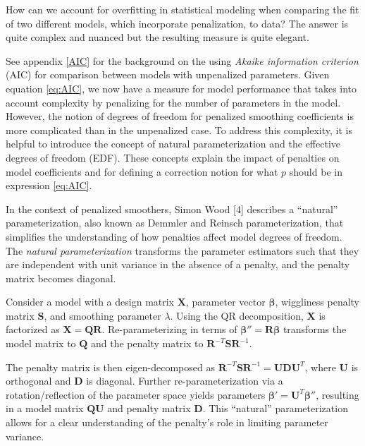 \documentclass[
11pt, %
oneside, %
english, %
singlespacing, %
]{macthesis} %
\begin{document}
How can we account for overfitting in statistical modeling when comparing the fit of two different models, which incorporate penalization, to data? The answer is quite complex and nuanced but the resulting measure is quite elegant.

See appendix \ref{AIC} for the background on the using \emph{Akaike information criterion} (AIC) for comparison between models with unpenalized parameters. Given equation \ref{eq:AIC}, we now have a measure for model performance that takes into account complexity by penalizing for the number of parameters in the model. However, the notion of degrees of freedom for penalized smoothing coefficients is more complicated than in the unpenalized case. To address this complexity, it is helpful to introduce the concept of natural parameterization and the effective degrees of freedom (EDF). These concepts explain the impact of penalties on model coefficients and for defining a correction notion for what \(p\) should be in expression \ref{eq:AIC}.

In the context of penalized smoothers, Simon Wood {[}4{]} describes a ``natural'' parameterization, also known as Demmler and Reinsch parameterization, that simplifies the understanding of how penalties affect model degrees of freedom. The \emph{natural parameterization} transforms the parameter estimators such that they are independent with unit variance in the absence of a penalty, and the penalty matrix becomes diagonal.

Consider a model with a design matrix \(\mathbf{X}\), parameter vector \(\boldsymbol{\beta}\), wiggliness penalty matrix \(\mathbf{S}\), and smoothing parameter \(\lambda\). Using the QR decomposition, \(\mathbf{X}\) is factorized as \(\mathbf{X} = \mathbf{Q} \mathbf{R}\). Re-parameterizing in terms of \(\boldsymbol{\beta''} = \mathbf{R} \boldsymbol{\beta}\) transforms the model matrix to \(\mathbf{Q}\) and the penalty matrix to \(\mathbf{R}^{-T} \mathbf{S} \mathbf{R}^{-1}\).

The penalty matrix is then eigen-decomposed as \(\mathbf{R}^{-T} \mathbf{S} \mathbf{R}^{-1} = \mathbf{U} \mathbf{D} \mathbf{U}^T\), where \(\mathbf{U}\) is orthogonal and \(\mathbf{D}\) is diagonal. Further re-parameterization via a rotation/reflection of the parameter space yields parameters \(\boldsymbol{\beta'} = \mathbf{U}^T \boldsymbol{\beta''}\), resulting in a model matrix \(\mathbf{Q} \mathbf{U}\) and penalty matrix \(\mathbf{D}\). This ``natural'' parameterization allows for a clear understanding of the penalty's role in limiting parameter variance.
\end{document}
